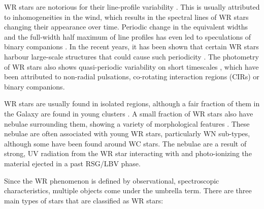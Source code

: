 WR stars are notorious for their line-profile variability \citep{lepine_wind_1996,lepine_wind_2000,st-louis_systematic_2009,chene_systematic_2011,chene_clumping_2020}. This is usually attributed to inhomogeneities in the wind, which results in the spectral lines of WR stars changing their appearance over time. Periodic change in the equivalent widths and the full-width half maximum of line profiles has even led to speculations of binary companions \citep[e.g. WR 1][]{morel_investigation_1999}. In the recent years, it has been shown that certain WR stars harbour large-scale structures that could cause such periodicity \citep[e.g.][]{st-louis_measuring_2008,aldoretta_extensive_2016,st-louis_polarization_2018}. The photometry of WR stars also shows quasi-periodic variability on short timescales \citep[e.g.][]{moffat_photometric_1986,balona_intensive_1989,st-louis_brite_2020}, which have been attributed to non-radial pulsations, co-rotating interaction regions (CIRs) or binary companions.

WR stars are usually found in isolated regions, although a fair fraction of them in the Galaxy are found in young clusters \citep{rosslowe_spatial_2015}. A small fraction of WR stars also have nebulae surrounding them, showing a variety of morphological features \citep{toala_wise_2015}. These nebulae are often associated with young WR stars, particularly WN sub-types, although some have been found around WC stars. The nebulae are a result of strong, UV radiation from the WR star interacting with and photo-ionizing the material ejected in a past RSG/LBV phase.

Since the WR phenomenon is defined by observational, spectroscopic characteristics, multiple objects come under the umbrella term. There are three main types of stars that are classified as WR stars:

